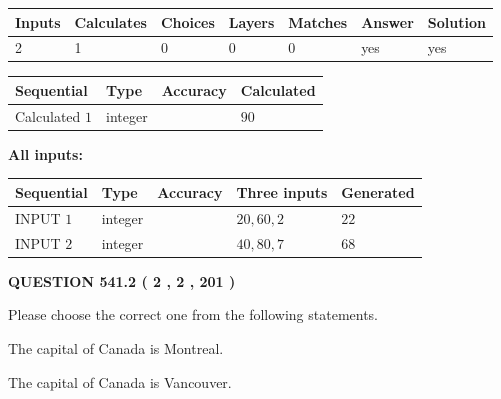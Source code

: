 \documentclass[12pt]{article}
\begin{document}
   
   
   
\noindent\begin{tabular}{|l|l|l|l|l|l|l|}
 \hline
Inputs & Calculates & Choices & Layers & Matches & Answer & Solution \\ \hline
 2  & 
 1  & 
 0
  & 
 0  & 
 0  & 
  yes & 
  yes 
  \\ \hline
 \end{tabular}
   
   
   
   
\noindent{}
   
   
  
  
\noindent\begin{tabular}{|l|l|l|l|}
\hline
 Sequential & Type & Accuracy & Calculated \\ 
\hline
 
 
  Calculated $  1 $ & integer &  & 
  $ 90 $ 
 \\  \hline  
 \end{tabular}
   
   
   
   
\noindent\vspace{0.1in}\hspace{-0.08in} {\textbf{\Large{All inputs: }}}
   
   
  
  
\noindent\begin{tabular}{|l|l|l|l|l|}
\hline
 Sequential & Type & Accuracy & Three inputs & Generated \\ 
\hline
 
 
  INPUT $  1 $ & integer &  & $
 20
 , 
 60
 , 
 2
 $ & $ 22 $ 
 \\  \hline  
 
 
  INPUT $  2 $ & integer &  & $
 40
 , 
 80
 , 
 7
 $ & $ 68 $ 
 \\  \hline  
 \end{tabular}
   
   
  
\vspace{0.2in}
  
{\textbf{\Large{QUESTION
541.2 
 ( 2 , 2 , 201 )
}}}
  
  
Please choose the correct one from the following statements.
 
 
The capital of Canada is Montreal.
 
 
The capital of Canada is Vancouver.
 
\end{document}

